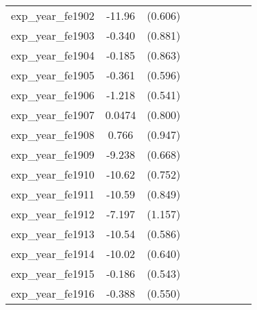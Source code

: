 {\begin{tabular}{l*{4}{cc}}
exp\_year\_fe1902&   -11.96\sym{***}&  (0.606)&                  &         &                  &         &                  &         \\
exp\_year\_fe1903&   -0.340         &  (0.881)&                  &         &                  &         &                  &         \\
exp\_year\_fe1904&   -0.185         &  (0.863)&                  &         &                  &         &                  &         \\
exp\_year\_fe1905&   -0.361         &  (0.596)&                  &         &                  &         &                  &         \\
exp\_year\_fe1906&   -1.218\sym{*}  &  (0.541)&                  &         &                  &         &                  &         \\
exp\_year\_fe1907&   0.0474         &  (0.800)&                  &         &                  &         &                  &         \\
exp\_year\_fe1908&    0.766         &  (0.947)&                  &         &                  &         &                  &         \\
exp\_year\_fe1909&   -9.238\sym{***}&  (0.668)&                  &         &                  &         &                  &         \\
exp\_year\_fe1910&   -10.62\sym{***}&  (0.752)&                  &         &                  &         &                  &         \\
exp\_year\_fe1911&   -10.59\sym{***}&  (0.849)&                  &         &                  &         &                  &         \\
exp\_year\_fe1912&   -7.197\sym{***}&  (1.157)&                  &         &                  &         &                  &         \\
exp\_year\_fe1913&   -10.54\sym{***}&  (0.586)&                  &         &                  &         &                  &         \\
exp\_year\_fe1914&   -10.02\sym{***}&  (0.640)&                  &         &                  &         &                  &         \\
exp\_year\_fe1915&   -0.186         &  (0.543)&                  &         &                  &         &                  &         \\
exp\_year\_fe1916&   -0.388         &  (0.550)&                  &         &                  &         &                  &         \\

\end{tabular}}
